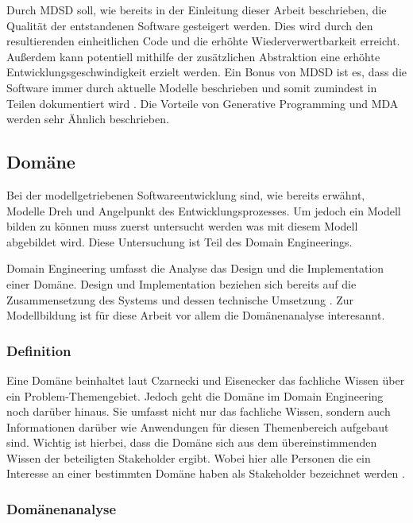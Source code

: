 \documentclass[12pt,oneside,a4paper,parskip]{scrbook}
\begin{document}
Durch MDSD soll, wie bereits in der Einleitung dieser Arbeit beschrieben, die Qualität der entstandenen Software gesteigert werden. Dies wird durch den resultierenden einheitlichen Code und die erhöhte Wiederverwertbarkeit erreicht. Außerdem kann potentiell mithilfe der zusätzlichen Abstraktion eine erhöhte Entwicklungsgeschwindigkeit erzielt werden. Ein Bonus von MDSD ist es, dass die Software immer durch aktuelle Modelle beschrieben und somit zumindest in Teilen dokumentiert wird \cite[S. 13ff.]{stahl2007}. Die Vorteile von Generative Programming \cite[S. 13ff.]{czaeis2000} und MDA \cite{mdaguide} werden sehr Ähnlich beschrieben.

\subsection{Domäne}

Bei der modellgetriebenen Softwareentwicklung sind, wie bereits erwähnt, Modelle Dreh und Angelpunkt des Entwicklungsprozesses. Um jedoch ein Modell bilden zu können muss zuerst untersucht werden was mit diesem Modell abgebildet wird. Diese Untersuchung ist Teil des Domain Engineerings.

Domain Engineering umfasst die Analyse das Design und die Implementation einer Domäne. Design und Implementation beziehen sich bereits auf die Zusammensetzung des Systems und dessen technische Umsetzung \cite[S. 21f.]{czaeis2000}. Zur Modellbildung ist für diese Arbeit vor allem die Domänenanalyse interesannt.

\subsubsection{Definition}

Eine Domäne beinhaltet laut Czarnecki und Eisenecker das fachliche Wissen über ein Problem-Themengebiet. Jedoch geht die Domäne im Domain Engineering noch darüber hinaus. Sie umfasst nicht nur das fachliche Wissen, sondern auch Informationen darüber wie Anwendungen für diesen Themenbereich aufgebaut sind. Wichtig ist hierbei, dass die Domäne sich aus dem übereinstimmenden Wissen der beteiligten Stakeholder ergibt. Wobei hier alle Personen die ein Interesse an einer bestimmten Domäne haben als Stakeholder bezeichnet werden \cite[S. 33]{czaeis2000}.

\subsubsection{Domänenanalyse}
\end{document}
